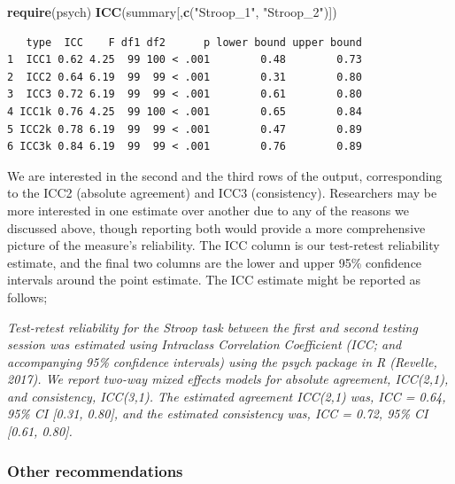 \documentclass[english,,man,floatsintext]{apa6}
\newenvironment{Shaded}{\begin{snugshade}}{\end{snugshade}}
\newcommand{\KeywordTok}[1]{\textcolor[rgb]{0.13,0.29,0.53}{\textbf{#1}}}
\newcommand{\NormalTok}[1]{#1}
\newcommand{\StringTok}[1]{\textcolor[rgb]{0.31,0.60,0.02}{#1}}
\begin{document}
\begin{Shaded}
\begin{Highlighting}[]
\KeywordTok{require}\NormalTok{(psych)}
\KeywordTok{ICC}\NormalTok{(summary[,}\KeywordTok{c}\NormalTok{(}\StringTok{"Stroop_1"}\NormalTok{, }\StringTok{"Stroop_2"}\NormalTok{)])}
\end{Highlighting}
\end{Shaded}

\newpage

\begin{verbatim}
   type  ICC    F df1 df2      p lower bound upper bound
1  ICC1 0.62 4.25  99 100 < .001        0.48        0.73
2  ICC2 0.64 6.19  99  99 < .001        0.31        0.80
3  ICC3 0.72 6.19  99  99 < .001        0.61        0.80
4 ICC1k 0.76 4.25  99 100 < .001        0.65        0.84
5 ICC2k 0.78 6.19  99  99 < .001        0.47        0.89
6 ICC3k 0.84 6.19  99  99 < .001        0.76        0.89
\end{verbatim}

We are interested in the second and the third rows of the output, corresponding to the ICC2 (absolute agreement) and ICC3 (consistency). Researchers may be more interested in one estimate over another due to any of the reasons we discussed above, though reporting both would provide a more comprehensive picture of the measure's reliability. The ICC column is our test-retest reliability estimate, and the final two columns are the lower and upper 95\% confidence intervals around the point estimate. The ICC estimate might be reported as follows;

\emph{Test-retest reliability for the Stroop task between the first and second testing session was estimated using Intraclass Correlation Coefficient (ICC; and accompanying 95\% confidence intervals) using the psych package in R (Revelle, 2017). We report two-way mixed effects models for absolute agreement, ICC(2,1), and consistency, ICC(3,1). The estimated agreement ICC(2,1) was, ICC = 0.64, 95\% CI {[}0.31, 0.80{]}, and the estimated consistency was, ICC = 0.72, 95\% CI {[}0.61, 0.80{]}.}

\hypertarget{other-recommendations}{%
\subsubsection{Other recommendations}\label{other-recommendations}}
\end{document}
